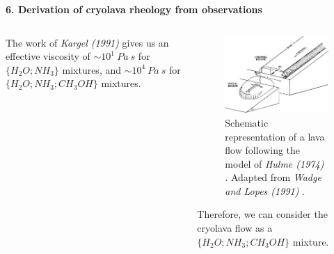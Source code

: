 \documentclass[final,t]{beamer}
\begin{document}
\begin{frame}
\begin{columns}[t]
\begin{column}{.495\linewidth}
\begin{block}{\textbf{6. Derivation of cryolava rheology from observations}}
\begin{columns}
\begin{column}{0.49\textwidth}
  The work of \emph{Kargel (1991)} \cite{kargel_1990} gives us an effective viscosity of $\sim 10^1\ Pa\ s$ for $\{H_2O;NH_3\}$ mixtures, and $\sim 10^4\ Pa\ s$ for $\{H_2O;NH_3;CH_3OH\}$ mixtures.
  \end{column}
  \begin{column}{0.49\textwidth}
  	\begin{figure}[h]
  	\centering
  	\includegraphics[scale=0.85]{levee.png} 
  	\caption{Schematic representation of a lava flow following
the model of \emph{Hulme (1974)} \cite{hulme_1974}. Adapted from \emph{Wadge and Lopes (1991)} \cite{WadgeLopes}.}%
  	\end{figure}
  	Therefore, we can consider the cryolava flow as a $\{H_2O;NH_3;CH_3OH\}$ mixture.
  \end{column}
  \end{columns}

  \end{block}
  
  
   \end{column}
   


  

  \end{columns}
  
  \vspace{1cm}
  

\end{frame}
\end{document}
